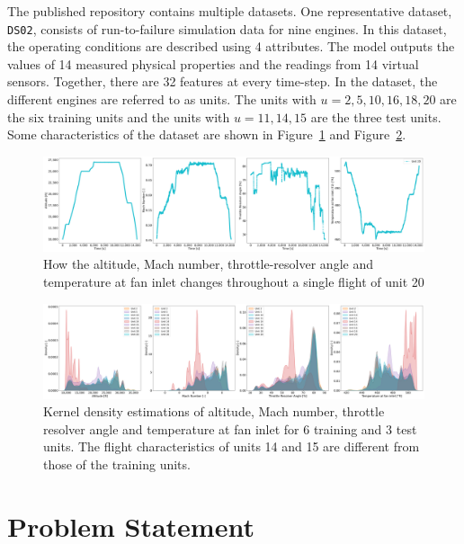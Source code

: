 \documentclass[a4paper,12pt]{article}
\begin{document}
The published repository contains multiple datasets. One representative dataset,
\texttt{DS02}, consists of run-to-failure simulation data for nine engines. In
this dataset, the operating conditions are described using 4 attributes. The
model outputs the values of 14 measured physical properties and the readings
from 14 virtual sensors. Together, there are 32 features at every time-step. In
the dataset, the different engines are referred to as units. The units with
$u = 2, 5, 10, 16, 18, 20$ are the six training units and the units with
$u = 11, 14, 15$ are the three test units. Some characteristics of the dataset
are shown in Figure~\ref{fig:flight_profile} and Figure~\ref{fig:unit_kde}.

\begin{figure}
    \centering
    \includegraphics[width=\linewidth]{flight_profile.png}
    \caption{How the altitude, Mach number, throttle-resolver angle and temperature at fan inlet changes throughout a single flight of unit 20}
    \label{fig:flight_profile}
\end{figure}


\begin{figure}
    \centering
    \includegraphics[width=\linewidth]{kde.png}
    \caption{Kernel density estimations of altitude, Mach number, throttle resolver angle and temperature at fan inlet for 6 training and 3 test units. The flight characteristics of units 14 and 15 are different from those of the training units.}
    \label{fig:unit_kde}
\end{figure}


\section{Problem Statement}
\end{document}
